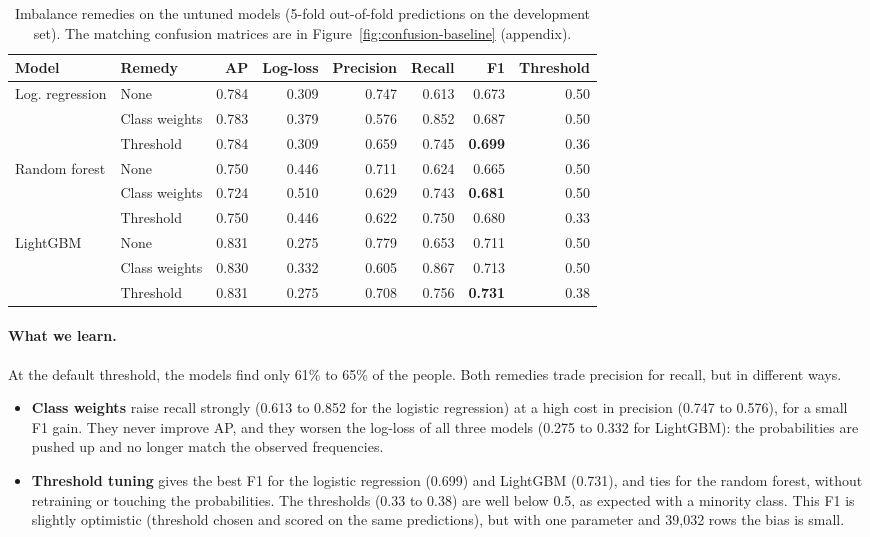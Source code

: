 \begin{table}[H]
\centering
\caption{Imbalance remedies on the untuned models (5-fold out-of-fold
predictions on the development set). The matching confusion matrices are in
Figure~\ref{fig:confusion-baseline} (appendix).}
\label{tab:imbalance}
\small
\setlength{\tabcolsep}{4pt}
\begin{tabular}{llrrrrrr}
\toprule
Model & Remedy & AP & Log-loss & Precision & Recall & F1 & Threshold \\
\midrule
Log. regression     & None         & 0.784 & 0.309 & 0.747 & 0.613 & 0.673 & 0.50 \\
                    & Class weights & 0.783 & 0.379 & 0.576 & 0.852 & 0.687 & 0.50 \\
                    & Threshold     & 0.784 & 0.309 & 0.659 & 0.745 & \textbf{0.699} & 0.36 \\
\midrule
Random forest       & None          & 0.750 & 0.446 & 0.711 & 0.624 & 0.665 & 0.50 \\
                    & Class weights & 0.724 & 0.510 & 0.629 & 0.743 & \textbf{0.681} & 0.50 \\
                    & Threshold     & 0.750 & 0.446 & 0.622 & 0.750 & 0.680 & 0.33 \\
\midrule
LightGBM            & None          & 0.831 & 0.275 & 0.779 & 0.653 & 0.711 & 0.50 \\
                    & Class weights & 0.830 & 0.332 & 0.605 & 0.867 & 0.713 & 0.50 \\
                    & Threshold     & 0.831 & 0.275 & 0.708 & 0.756 & \textbf{0.731} & 0.38 \\
\bottomrule
\end{tabular}
\end{table}

\paragraph{What we learn.} At the default threshold, the models find only 61\%
to 65\% of the \pos{} people. Both remedies trade precision for recall, but in
different ways.
\begin{itemize}
  \item \textbf{Class weights} raise recall strongly (0.613 to 0.852 for the
  logistic regression) at a high cost in precision (0.747 to 0.576), for a
  small F1 gain. They never improve AP, and they worsen the log-loss of all
  three models (0.275 to 0.332 for LightGBM): the probabilities are pushed up
  and no longer match the observed frequencies.
  \item \textbf{Threshold tuning} gives the best F1 for the logistic regression
  (0.699) and LightGBM (0.731), and ties for the random forest, without
  retraining or touching the probabilities. The thresholds (0.33 to 0.38) are
  well below 0.5, as expected with a minority class. This F1 is slightly
  optimistic (threshold chosen and scored on the same predictions), but with
  one parameter and 39{,}032 rows the bias is small.
\end{itemize}

